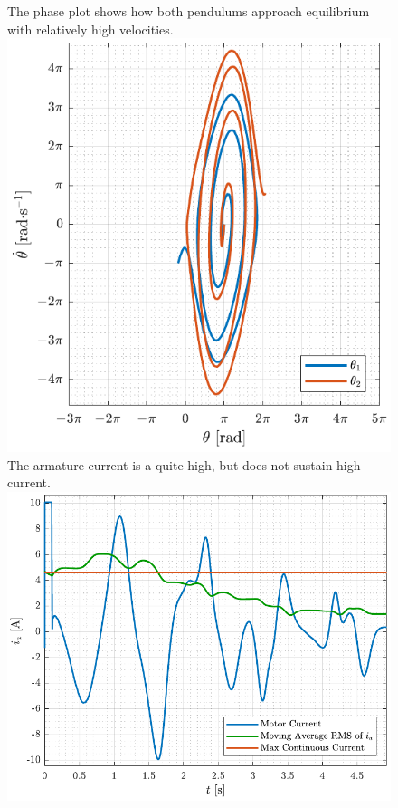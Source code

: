 \begin{figure}[H]
  \hspace{-10pt}
  \captionbox
  {
    The phase plot shows how both pendulums approach equilibrium with relatively high velocities.
    \label{fig:phaseSwingAttempt}
  }
  {
    \hspace{-1cm}
    \includegraphics[width=.5\textwidth]{figures/phaseSwingAttempt}
  }
  \hspace{20pt}
  \captionbox 
  {
    The armature current is a quite high, but does not sustain high current.
    \label{fig:iaSwingAttempt}
  }
  {
    \hspace{-1cm}
    \includegraphics[width=.5\textwidth]{figures/iaSwingAttempt}
  }  
\end{figure}

